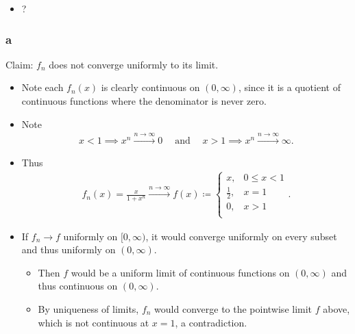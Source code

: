 
\begin{solution}

\hfill

\begin{concept}

\hfill

\begin{itemize}
\tightlist
\item
  ?
\end{itemize}

\end{concept}

\hypertarget{a}{%
\subsubsection{a}\label{a}}

Claim: \(f_n\) does not converge uniformly to its limit.

\begin{itemize}
\item
  Note each \(f_n(x)\) is clearly continuous on \((0, \infty)\), since
  it is a quotient of continuous functions where the denominator is
  never zero.
\item
  Note
  \begin{align*}
  x < 1 \implies x^n \overset{n\to\infty}\to 0{\quad \operatorname{and} \quad} x>1 \implies x^n \overset{n\to\infty}\to \infty
  .\end{align*}
\item
  Thus
  \begin{align*}
  f_n(x) = \frac{x}{1+ x^n}\overset{n\to\infty}\longrightarrow
  f(x) \coloneqq
  \begin{cases}
  x, & 0 \leq x < 1 \\
  \frac 1 2, & x = 1 \\
  0, & x > 1 \\
  \end{cases}
  .\end{align*}
\item
  If \(f_n \to f\) uniformly on \([0, \infty)\), it would converge
  uniformly on every subset and thus uniformly on \((0, \infty)\).

  \begin{itemize}
  \tightlist
  \item
    Then \(f\) would be a uniform limit of continuous functions on
    \((0, \infty)\) and thus continuous on \((0, \infty)\).
  \item
    By uniqueness of limits, \(f_n\) would converge to the pointwise
    limit \(f\) above, which is not continuous at \(x=1\), a
    contradiction.
  \end{itemize}
\end{itemize}


\end{solution}
